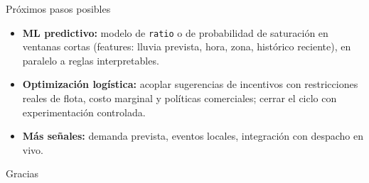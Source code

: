 \documentclass[aspectratio=169,spanish]{beamer}
\begin{document}
\begin{frame}{Próximos pasos posibles}
  \begin{itemize}
    \item \textbf{ML predictivo:} modelo de \texttt{ratio} o de probabilidad de saturación en ventanas cortas (features: lluvia prevista, hora, zona, histórico reciente), en paralelo a reglas interpretables.
    \item \textbf{Optimización logística:} acoplar sugerencias de incentivos con restricciones reales de flota, costo marginal y políticas comerciales; cerrar el ciclo con experimentación controlada.
    \item \textbf{Más señales:} demanda prevista, eventos locales, integración con despacho en vivo.
  \end{itemize}
\end{frame}



\begin{frame}{}
  \centering
  {\Huge Gracias}

\end{frame}
\end{document}
